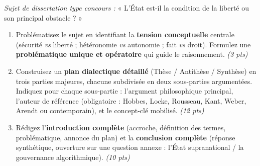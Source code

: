 \documentclass[11pt]{article}
\begin{document}
\begin{exercice}
\textit{Sujet de dissertation type concours :} « L'État est-il la condition de la liberté ou son principal obstacle ? »

\begin{enumerate}
    \item Problématisez le sujet en identifiant la \textbf{tension conceptuelle} centrale (sécurité \textit{vs} liberté ; hétéronomie \textit{vs} autonomie ; fait \textit{vs} droit). Formulez une \textbf{problématique unique et opératoire} qui guide le raisonnement. \textit{(3 pts)}
    \item Construisez un \textbf{plan dialectique détaillé} (Thèse / Antithèse / Synthèse) en trois parties majeures, chacune subdivisée en deux sous-parties argumentées. Indiquez pour chaque sous-partie : l'argument philosophique principal, l'auteur de référence (obligatoire : Hobbes, Locke, Rousseau, Kant, Weber, Arendt ou contemporain), et le concept-clé mobilisé. \textit{(12 pts)}
    \item Rédigez l'\textbf{introduction complète} (accroche, définition des termes, problématique, annonce du plan) et la \textbf{conclusion complète} (réponse synthétique, ouverture sur une question annexe : l'État supranational / la gouvernance algorithmique). \textit{(10 pts)}
\end{enumerate}
\end{exercice}
\end{document}
